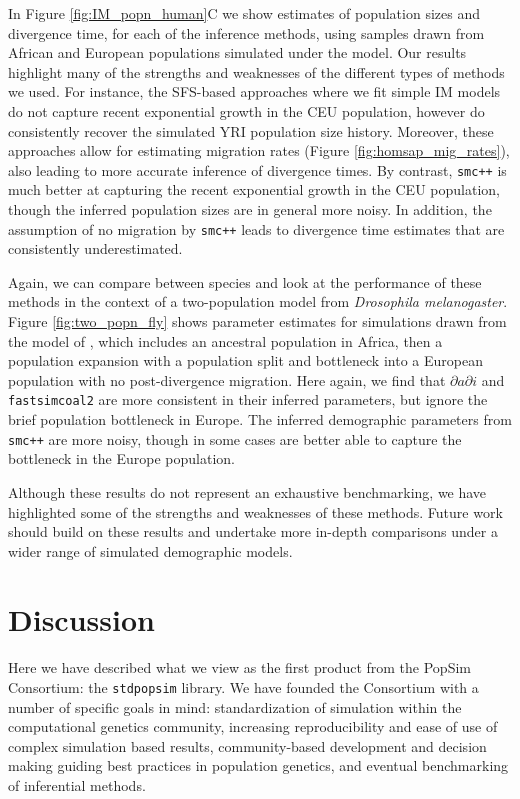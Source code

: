 \documentclass[12pt,halfline,a4paper]{ouparticle}
\newcommand{\stdpopsim}{\texttt{stdpopsim}\xspace}
\newcommand{\dadi}{$\partial a \partial i$\xspace}
\newcommand{\smcpp}{\texttt{smc++}\xspace}
\newcommand{\fastsimcoal}{\texttt{fastsimcoal2}\xspace}
\begin{document}
In Figure \ref{fig:IM_popn_human}C we show estimates of population sizes and divergence
time, for each of the inference methods, using samples drawn from African and European populations
simulated under the \cite{gutenkunst2009inferring} model. Our results highlight many
of the strengths and weaknesses of the different types of methods we used.
For instance, the SFS-based approaches where we fit simple IM models do not capture
recent exponential growth in the CEU population, however do consistently recover the
simulated YRI population size history. Moreover, these approaches allow for estimating
migration rates (Figure \ref{fig:homsap_mig_rates}), also leading to more accurate inference
of divergence times. By contrast, \smcpp is much better at capturing the recent exponential
growth in the CEU population, though the inferred population sizes are in general more
noisy. In addition, the assumption of no migration by \smcpp leads to divergence time
estimates that are consistently underestimated.

Again, we can compare between species and look at the performance of these methods in
the context of a two-population model from \emph{Drosophila melanogaster}. Figure
\ref{fig:two_popn_fly} shows parameter estimates for simulations drawn from
the model of \cite{li2006inferring}, which includes
an ancestral population in Africa, then a population expansion with a population
split and bottleneck into a European population with no post-divergence migration.
Here again, we find that \dadi and \fastsimcoal are more consistent in their inferred
parameters, but ignore the brief population bottleneck in Europe. The inferred
demographic parameters from \smcpp are more noisy, though in some cases are better
able to capture the bottleneck in the Europe population.

Although these results do not represent an exhaustive benchmarking,
we have highlighted some of the strengths and weaknesses of these methods.
Future work should build on these results and undertake more in-depth comparisons
under a wider range of simulated demographic models.

\section*{Discussion}

Here we have described what we view as the first product from the PopSim Consortium:
the \stdpopsim library. We have founded the Consortium with a number of specific goals in mind:
standardization of simulation within the computational genetics community,
increasing reproducibility and ease of use of complex simulation based results,
community-based development and decision making guiding best practices in population genetics,
and eventual benchmarking of inferential methods.
\end{document}
